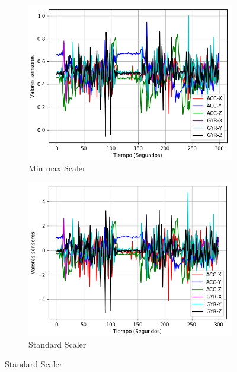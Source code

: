 \begin{figure}
        \centering
        \begin{subfigure}[h]{0.45\textwidth} 
            \includegraphics[width=\textwidth]{imagenes/Cap3/datos_minmax_scaler}
            \caption{Min max Scaler}
            \label{fig:min_max}
        \end{subfigure}       
        \begin{subfigure}[h]{0.45\textwidth} 
            \includegraphics[width=\textwidth]{imagenes/Cap3/datos_standard_scaler}
            \caption{Standard Scaler}
            \label{fig:standard}
        \end{subfigure}
        

\end{figure}
